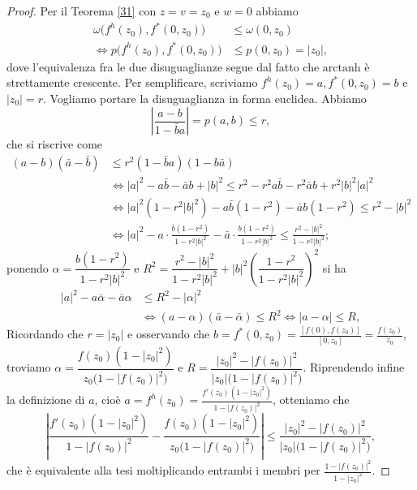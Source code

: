\begin{proof}
  Per il Teorema \ref{31} con $z=v=z_0$ e $w=0$ abbiamo
  \begin{align*}
    \omega\bigl(f^h(z_0),f^*(0,z_0)\bigr) & \le \omega(0,z_0) \\
    \iff p\bigl(f^h(z_0),f^*(0,z_0)\bigr) & \le p(0,z_0)=|z_0|,
  \end{align*}
  dove l'equivalenza fra le due disuguaglianze segue dal fatto che $\text{arctanh}$ è strettamente crescente. Per semplificare, scriviamo $f^h(z_0)=a, f^*(0,z_0)=b$ e $|z_0|=r$. Vogliamo portare la disuguaglianza in forma euclidea. Abbiamo
  $$\left|\frac{a-b}{1-\bar{b}a}\right|=p(a,b) \le r,$$
  che si riscrive come
  \begin{align*}
    (a-b)(\bar{a}-\bar{b}) & \le r^2(1-\bar{b}a)(1-b\bar{a}) \\
    & \iff |a|^2-a\bar{b}-\bar{a}b+|b|^2 \le r^2-r^2a\bar{b}-r^2\bar{a}b+r^2|b|^2|a|^2 \\
    & \iff |a|^2(1-r^2|b|^2)-a\bar{b}(1-r^2)-\bar{a}b(1-r^2) \le r^2-|b|^2 \\
    & \iff |a|^2-a\cdot\frac{\bar{b}(1-r^2)}{1-r^2|b|^2}-\bar{a}\cdot\frac{b(1-r^2)}{1-r^2|b|^2} \le \frac{r^2-|b|^2}{1-r^2|b|^2};
  \end{align*}
  ponendo $\alpha=\dfrac{b(1-r^2)}{1-r^2|b|^2}$ e $R^2=\dfrac{r^2-|b|^2}{1-r^2|b|^2}+|b|^2\left(\dfrac{1-r^2}{1-r^2|b|^2}\right)^2$ si ha
  \begin{align*}
    |a|^2-a\bar{\alpha}-\bar{a}\alpha & \le R^2-|\alpha|^2 \\
    & \iff (a-\alpha)(\bar{a}-\bar{\alpha}) \le R^2\iff |a-\alpha| \le R,
  \end{align*}
  Ricordando che $r=|z_0|$ e osservando che $b=f^*(0,z_0)=\frac{[f(0),f(z_0)]}{[0,z_0]}=\frac{f(z_0)}{z_0}$, troviamo $\alpha=\dfrac{f(z_0)(1-|z_0|^2)}{z_0\bigl(1-|f(z_0)|^2\bigr)}$ e $R=\dfrac{|z_0|^2-|f(z_0)|^2}{|z_0|\bigl(1-|f(z_0)|^2\bigr)}$.
  Riprendendo infine la definizione di $a$, cioè $a=f^h(z_0)=\frac{f'(z_0)(1-|z_0|^2)}{1-|f(z_0)|^2}$, otteniamo che
  $$\left|\frac{f'(z_0)(1-|z_0|^2)}{1-|f(z_0)|^2}-\frac{f(z_0)(1-|z_0|^2)}{z_0\bigl(1-|f(z_0)|^2\bigr)}\right| \le \frac{|z_0|^2-|f(z_0)|^2}{|z_0|\bigl(1-|f(z_0)|^2\bigr)},$$
  che è equivalente alla tesi moltiplicando entrambi i membri per $\frac{1-|f(z_0)|^2}{1-|z_0|^2}$.
\end{proof}
